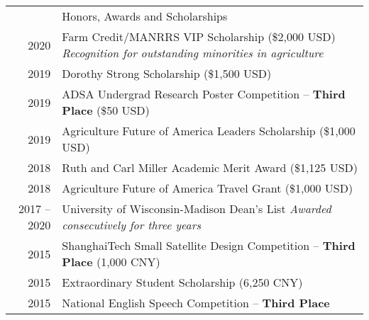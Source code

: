 \documentclass[letterpaper, 11pt]{article}
\newcommand{\headingfont}{\Large\color{OliveGreen}}
\newenvironment{SectionTableSingleSpace}[1]{
	\renewcommand*{\arraystretch}{1.2}
	\setlength{\tabcolsep}{10pt}
	\begin{longtable}{Rp{5.2in}} & #1 \\[0.6em]}
{\end{longtable}\vspace{-.3cm}}
\begin{document}
\begin{SectionTableSingleSpace}{\headingfont Honors, Awards and Scholarships}
2020 & 
Farm Credit/MANRRS VIP Scholarship (\$2,000 USD) \newline
\textit{Recognition for outstanding minorities in agriculture} \\
2019 & 
Dorothy Strong Scholarship (\$1,500 USD) \\
2019 & 
ADSA Undergrad Research Poster Competition -- \textbf{Third Place} (\$50 USD) \\
2019 & 
Agriculture Future of America Leaders Scholarship (\$1,000 USD) \\
2018 & 
Ruth and Carl Miller Academic Merit Award (\$1,125 USD) \\
2018 & 
Agriculture Future of America Travel Grant (\$1,000 USD) \\
2017 -- 2020 & 
University of Wisconsin-Madison Dean's List \newline
\textit{Awarded consecutively for three years} \\
2015 & 
ShanghaiTech Small Satellite Design Competition -- \textbf{Third Place} (1,000 CNY) \\
2015 & 
Extraordinary Student Scholarship (6,250 CNY) \\
2015 & 
National English Speech Competition -- \textbf{Third Place}
\end{SectionTableSingleSpace}
\end{document}
